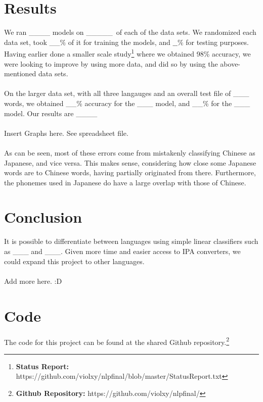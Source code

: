 \documentclass{paper}
\begin{document}
\section{Results}
We ran \_\_\_\_ models on \_\_\_\_\_\ of each of the data sets. We randomized each data set, took \_\_$\%$ of it for training the models, and $\_\_\%$ for testing purposes. Having earlier done a smaller scale study\footnote{\textbf{Status Report:} https://github.com/violxy/nlpfinal/blob/master/StatusReport.txt} where we obtained 98\% accuracy, we were looking to improve by using more data, and did so by using the above-mentioned data sets.\\
\\On the larger data set, with all three langauges and an overall test file of \_\_\_ words, we obtained \_\_\% accuracy for the \_\_\_ model, and \_\_\% for the \_\_\_ model. Our results are \_\_\_\_\\
\\Insert Graphs here. See spreadsheet file.\\
\\As can be seen, most of these errors come from mistakenly classifying Chinese as Japanese, and vice versa. This makes sense, considering how close some Japanese words are to Chinese words, having partially originated from there. Furthermore, the phonemes used in Japanese do have a large overlap with those of Chinese.
\section{Conclusion}
It is possible to differentiate between languages using simple linear classifiers such as \_\_\_ and \_\_\_. Given more time and easier access to IPA converters, we could expand this project to other languages.\\
\\Add more here. :D
\section{Code}
The code for this project can be found at the shared Github repository.\footnote{\textbf{Github Repository: }https://github.com/violxy/nlpfinal/}
\end{document}
